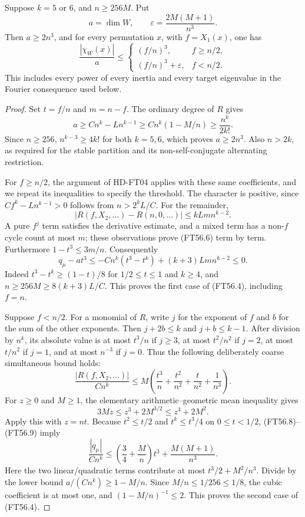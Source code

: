 \begin{lemma}[HD-FT07]
Suppose \(k=5\) or \(6\), and \(n\ge256M\).  Put
\[
 a=\dim W,\qquad
 \varepsilon=\frac{2M(M+1)}{n^3}.
 \tag{FT56.3}
\]
Then \(a\ge2n^3\), and for every permutation \(x\), with
\(f=X_1(x)\), one has
\[
 \frac{|\chi_W(x)|}{a}\le
 \begin{cases}
 (f/n)^3,&f\ge n/2,\\
 (f/n)^3+\varepsilon,&f<n/2.
 \end{cases}
 \tag{FT56.4}
\]
This includes every power of every inertia and every target eigenvalue
in the Fourier consequence used below.
\end{lemma}

\begin{proof}
Set \(t=f/n\) and \(m=n-f\).  The ordinary degree of \(R\) gives
\[
 a\ge Cn^k-Ln^{k-1}\ge Cn^k(1-M/n)\ge\frac{n^k}{2k!}.
 \tag{FT56.5}
\]
Since \(n\ge256\), \(n^{k-3}\ge4k!\) for both \(k=5,6\),
which proves \(a\ge2n^3\).  Also \(n>2k\), as required for the
stable partition and its non-self-conjugate alternating restriction.

For \(f\ge n/2\), the argument of HD-FT04 applies with these same
coefficients, and we repeat its inequalities to specify the threshold.
The character is positive, since
\(Cf^k-Ln^{k-1}>0\) follows from \(n>2^kL/C\).
For the remainder,
\[
 |R(f,X_2,\ldots)-R(n,0,\ldots)|
       \le kLm n^{k-2}.
 \tag{FT56.6}
\]
A pure \(f^j\) term satisfies the derivative estimate, and a mixed
term has a non-\(f\) cycle count at most \(m\); these observations
prove (FT56.6) term by term.  Furthermore \(1-t^3\le3m/n\).
Consequently
\[
 q_\mu-a t^3
 \le -Cn^k(t^3-t^k)+(k+3)Lm n^{k-2}\le0.
 \tag{FT56.7}
\]
Indeed \(t^3-t^k\ge(1-t)/8\) for \(1/2\le t\le1\) and \(k\ge4\),
and \(n\ge256M\ge8(k+3)L/C\).  This proves the first case of
(FT56.4), including \(f=n\).

Suppose \(f<n/2\).  For a monomial of \(R\), write \(j\) for the
exponent of \(f\) and \(b\) for the sum of the other exponents.
Then \(j+2b\le k\) and \(j+b\le k-1\).
After division by \(n^k\), its absolute value is at most
\(t^3/n\) if \(j\ge3\), at most \(t^2/n^2\) if \(j=2\),
at most \(t/n^2\) if \(j=1\), and at most \(n^{-3}\) if \(j=0\).
Thus the following deliberately coarse simultaneous bound holds:
\[
 \frac{|R(f,X_2,\ldots)|}{Cn^k}
 \le M\left(\frac{t^3}{n}+\frac{t^2}{n^2}
                   +\frac{t}{n^2}+\frac1{n^3}\right).
 \tag{FT56.8}
\]
For \(z\ge0\) and \(M\ge1\), the elementary arithmetic--geometric
mean inequality gives
\[
 3Mz\le z^3+2M^{3/2}\le z^3+2M^2.
 \tag{FT56.9}
\]
Apply this with \(z=nt\).  Because \(t^2\le t/2\) and
\(t^k\le t^3/4\) on \(0\le t<1/2\), (FT56.8)--(FT56.9) imply
\[
 \frac{|q_\mu|}{Cn^k}
 \le\left(\frac34+\frac Mn\right)t^3
                  +\frac{M(M+1)}{n^3}.
 \tag{FT56.10}
\]
Here the two linear/quadratic terms contribute at most
\(t^3/2+M^2/n^3\).  Divide by the lower bound
\(a/(Cn^k)\ge1-M/n\).
Since \(M/n\le1/256\le1/8\), the cubic coefficient is at most one,
and \((1-M/n)^{-1}\le2\).  This proves the second case of (FT56.4).
\end{proof}

